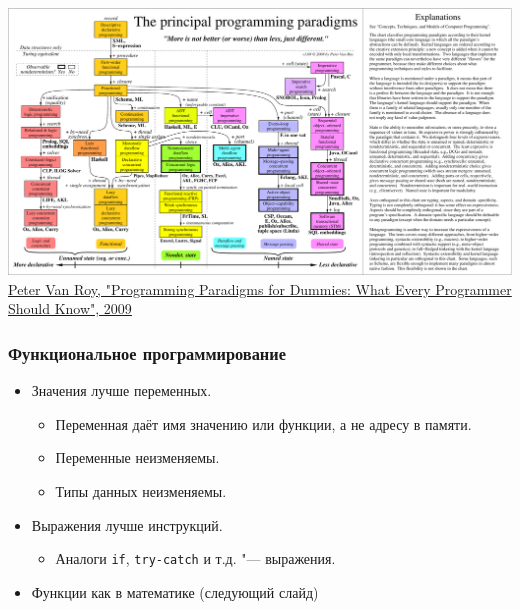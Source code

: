 \documentclass[10pt]{beamer}
\begin{document}
\begin{frame}
  \includegraphics[trim={0 0 144mm -2mm},clip,width=\textwidth,height=\textheight,keepaspectratio]{paradigmsDIAGRAMeng108.pdf}
  \footnotesize  \href{https://www.info.ucl.ac.be/~pvr/paradigms.html}{Peter Van Roy, "Programming Paradigms for Dummies: What Every Programmer Should Know", 2009}
\end{frame}

\begin{frame}
  \frametitle{Функциональное программирование}
  \begin{itemize}
    \item Значения лучше переменных.
          \begin{itemize}
            \item Переменная даёт имя значению или функции, а не адресу в памяти.
            \item Переменные неизменяемы.
            \item Типы данных неизменяемы.
          \end{itemize}
    \item Выражения лучше инструкций.
          \begin{itemize}
            \item Аналоги \lstinline|if|, \lstinline|try-catch| и т.д. "--- выражения.
          \end{itemize}
    \item Функции как в математике (следующий слайд)
  \end{itemize}
\end{frame}
\end{document}
